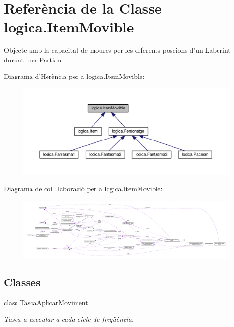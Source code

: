 \hypertarget{classlogica_1_1_item_movible}{\section{Referència de la Classe logica.\+Item\+Movible}
\label{classlogica_1_1_item_movible}
}


Objecte amb la capacitat de moures per les diferents poscions d'un Laberint durant una \hyperlink{classlogica_1_1_partida}{Partida}.  




Diagrama d'Herència per a logica.\+Item\+Movible\+:
\nopagebreak
\begin{figure}[H]
\begin{center}
\leavevmode
\includegraphics[width=350pt]{classlogica_1_1_item_movible__inherit__graph}
\end{center}
\end{figure}


Diagrama de col·laboració per a logica.\+Item\+Movible\+:
\nopagebreak
\begin{figure}[H]
\begin{center}
\leavevmode
\includegraphics[width=350pt]{classlogica_1_1_item_movible__coll__graph}
\end{center}
\end{figure}
\subsection*{Classes}
\begin{DoxyCompactItemize}
\item 
class \hyperlink{classlogica_1_1_item_movible_1_1_tasca_aplicar_moviment}{Tasca\+Aplicar\+Moviment}
\begin{DoxyCompactList}\small\item\em Tasca a executar a cada cicle de freqüència. \end{DoxyCompactList}\end{DoxyCompactItemize}
